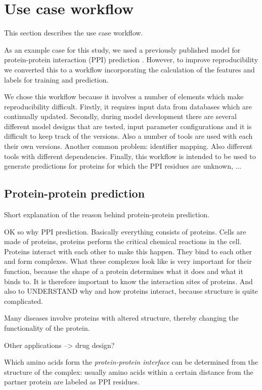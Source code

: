 \section{Use case workflow}
\label{sec:workflow}

This section describes the use case workflow.

As an example case for this study, we used a previously published model for protein-protein interaction (PPI) prediction \cite{capelMultiTaskLearningLeverage2022}. However, to improve reproducibility we converted this to a workflow incorporating the calculation of the features and labels for training and prediction. 

We chose this workflow because it involves a number of elements which make reproducibility difficult. Firstly, it requires input data from databases which are continually updated. Secondly, during model development there are several different model designs that are tested, input parameter configurations and it is difficult to keep track of the versions. Also a number of tools are used with each their own versions. Another common problem: identifier mapping. Also different tools with different dependencies. Finally, this workflow is intended to be used to generate predictions for proteins for which the PPI residues are unknown, ...

\subsection{Protein-protein prediction}

Short explanation of the reason behind protein-protein prediction.

OK so why PPI prediction. Basically everything consists of proteins. Cells are made of proteins, proteins perform the critical chemical reactions in the cell. Proteins interact with each other to make this happen. They bind to each other and form complexes. What these complexes look like is very important for their function, because the shape of a protein determines what it does and what it binds to. 
It is therefore important to know the interaction sites of proteins. And also to UNDERSTAND why and how proteins interact, because structure is quite complicated.

Many diseases involve proteins with altered structure, thereby changing the functionality of the protein.

Other applications --> drug design?

Which amino acids form the \emph{protein-protein interface} can be determined from the structure of the complex: usually amino acids within a certain distance from the partner protein are labeled as PPI residues.

